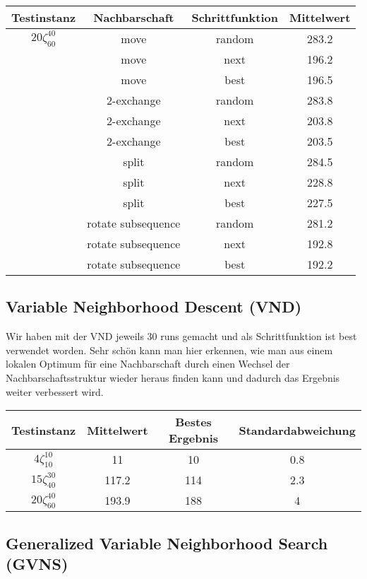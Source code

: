 \documentclass[a4paper,10pt]{article}
\begin{document}
\begin{tabular}{cccc}
\hline
Testinstanz & Nachbarschaft & Schrittfunktion & Mittelwert \\
\hline									
$20\zeta_{60}^{40}$ & move & random &  283.2 \\
							 		& move & next &  196.2 \\
									& move & best &  196.5 \\
							 		& 2-exchange & random &  283.8 \\
							 		& 2-exchange & next &  203.8 \\
									& 2-exchange & best &  203.5 \\
							 		& split & random &  284.5 \\
							 		& split & next &  228.8 \\
									& split & best & 227.5 \\
							 		& rotate subsequence & random &  281.2 \\
							 		& rotate subsequence & next &  192.8 \\
									& rotate subsequence & best & 192.2 \\																																																		
\hline
\end{tabular}

\bigskip

\subsection{Variable Neighborhood Descent (VND)}
Wir haben mit der VND jeweils 30 runs gemacht und als Schrittfunktion ist best verwendet worden. Sehr sch\"{o}n kann man hier erkennen, wie man aus einem lokalen Optimum f\"{u}r eine Nachbarschaft durch einen Wechsel der Nachbarschaftsstruktur wieder heraus finden kann und dadurch das Ergebnis weiter verbessert wird.
\bigskip

\begin{tabular}{cccc}
\hline
Testinstanz & Mittelwert & Bestes Ergebnis & Standardabweichung \\
\hline
$4\zeta_{10}^{10}$ & 11 & 10 & 0.8 \\									
$15\zeta_{40}^{30}$ & 117.2 & 114 & 2.3 \\									
$20\zeta_{60}^{40}$ & 193.9 & 188 & 4 \\						
\hline
\end{tabular}

\bigskip

\subsection{Generalized Variable Neighborhood Search (GVNS)}
\end{document}
